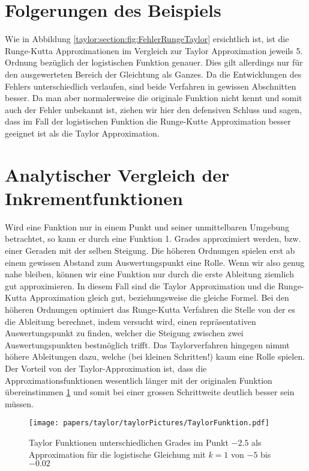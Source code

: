 %
%
%
\section{Folgerungen des Beispiels
\label{taylor:section:folgerungen}}
Wie in Abbildung \ref{taylor:section:fig:FehlerRungeTaylor} ersichtlich ist, ist die Runge-Kutta Approximationen im Vergleich zur Taylor Approximation jeweils 5. Ordnung bezüglich der logistischen Funktion genauer.
Dies gilt allerdings nur für den ausgewerteten Bereich der Gleichtung als Ganzes.
Da die Entwicklungen des Fehlers unterschiedlich verlaufen, sind beide Verfahren in gewissen Abschnitten besser.
Da man aber normalerweise die originale Funktion nicht kennt und somit auch der Fehler unbekannt ist, ziehen wir hier den defensiven Schluss und sagen, dass im Fall der logistischen Funktion die Runge-Kutte Approximation besser geeignet ist als die Taylor Approximation.

\section{Analytischer Vergleich der Inkrementfunktionen
\label{taylor:subsection:VergleichInkrementft}}
Wird eine Funktion nur in einem Punkt und seiner unmittelbaren Umgebung betrachtet, so kann er durch eine Funktion 1. Grades approximiert werden, bzw. einer Geraden mit der selben Steigung.
Die höheren Ordnungen spielen erst ab einem gewissen Abstand zum Auswertungspunkt eine Rolle.
Wenn wir also genug nahe bleiben, können wir eine Funktion nur durch die erste Ableitung ziemlich gut approximieren.
In diesem Fall sind die Taylor Approximation und die Runge-Kutta Approximation gleich gut, beziehungsweise die gleiche Formel.
Bei den höheren Ordnungen optimiert das Runge-Kutta Verfahren die Stelle von der es die Ableitung berechnet, indem versucht wird, einen repräsentativen Auswertungspunkt zu finden, welcher die Steigung zwischen zwei Auswertungspunkten bestmöglich trifft.
Das Taylorverfahren hingegen nimmt höhere Ableitungen dazu, welche (bei kleinen Schritten!) kaum eine Rolle spielen. 
Der Vorteil von der Taylor-Approximation ist, dass die Approximationsfunktionen wesentlich länger mit der originalen Funktion übereinstimmen \ref{taylor:section:fig:TaylorFunktion} und somit bei einer grossen Schrittweite deutlich besser sein müssen.

\begin{figure}
	\begin{center}
		\texttt{[image: papers/taylor/taylorPictures/TaylorFunktion.pdf]}
		\caption{Taylor Funktionen unterschiedlichen Grades im Punkt $-2.5$ als Approximation für die logistische Gleichung mit $k=1$ von $-5$ bis $-0.02$}
		\label{taylor:section:fig:TaylorFunktion}
	\end{center}
\end{figure}

